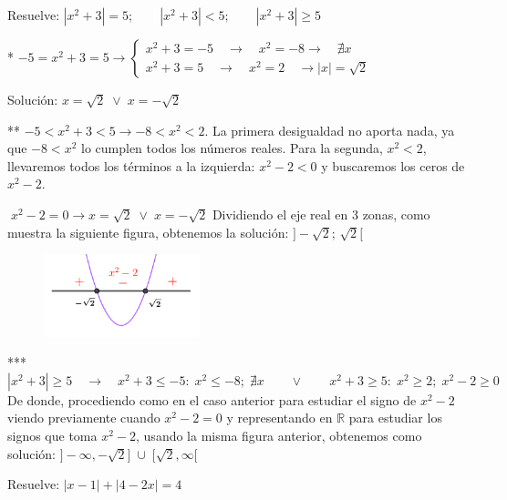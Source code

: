		\begin{ejre}
			Resuelve: $|x^2+3|=5;\qquad |x^2+3|<5; \qquad |x^2+3|\ge 5$
		\end{ejre}
		
		\begin{proofw}\renewcommand{\qedsymbol}{$\diamond$}
		
			* $-5=x^2+3=5 \to 
			\left\{ 
			\begin{matrix} 
				x^2+3=-5\quad \to \quad x^2=-8 \to \quad \nexists x\\ 
				x^2+3=5\quad \to \quad x^2=2 \quad \to |x|=\sqrt 2 
				\end{matrix} 
				\right.$  
				
				Solución: $x=\sqrt 2\; \vee \; x=-\sqrt2$
				
				 ** $-5<x^2+3<5 \to -8<x^2<2$. La primera desigualdad no aporta nada, ya que $-8<x^2$ lo cumplen todos los números reales. Para la segunda, $x^2<2$, llevaremos todos los términos a la izquierda: $x^2-2<0$ y buscaremos los ceros de 
				$x^2-2$. 
				
				$\; x^2-2=0 \to x=\sqrt 2 \; \vee \; x=-\sqrt 2$ Dividiendo el eje real en 3 zonas, como muestra la siguiente figura, obtenemos la solución: $]-\sqrt 2;\, \sqrt 2[$
				
			\begin{figure}[H]
			\centering
				\includegraphics[width=0.4\textwidth]{imagenes/imagenes01/T01IM04.png}
			\end{figure}
				
				 *** $|x^2+3|\ge 5 \quad \to \quad x^2+3\le -5: \; x^2\le -8; \; \nexists x \qquad  \vee \qquad  x^2+3\ge 5: \; x^2\ge 2; \; x^2-2\ge 0$ De donde, procediendo como en el caso anterior para estudiar el signo de $x^2-2$ viendo previamente cuando $x^2-2=0$ y representando en $\mathbb R$ para estudiar los signos que toma $x^2-2$, usando la misma figura anterior, obtenemos como solución: $]-\infty, -\sqrt 2]\; \cup \; [\sqrt 2, \infty[$
		\end{proofw}
		
		\begin{ejre}
			Resuelve: $|x-1|+|4-2x|=4$
		\end{ejre}
		
